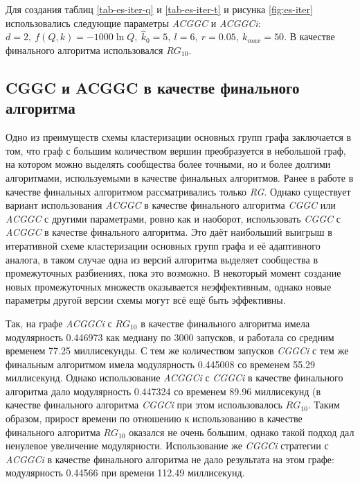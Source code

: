 Для создания таблиц \ref{tab-es-iter-q} и \ref{tab-es-iter-t} и рисунка \ref{fig:es-iter} использовались следующие параметры \emph{ACGGC} и \emph{ACGGCi}: $d = 2,\ f(Q, k) = -1000 \ln Q,\ \hat{k}_0 = 5,\ l = 6,\ r = 0.05,\ k_{max} = 50$. В качестве финального алгоритма использовался $RG_{10}$.



\subsection{CGGC и ACGGC в качестве финального алгоритма}

Одно из преимуществ схемы кластеризации основных групп графа заключается в том, что граф с большим количеством вершин преобразуется в небольшой граф, на котором можно выделять сообщества более точными, но и более долгими алгоритмами, используемыми в качестве финальных алгоритмов. Ранее в работе в качестве финальных алгоритмом рассматривались только \emph{RG}. Однако существует вариант использования \emph{ACGGC} в качестве финального алгоритма \emph{CGGC} или \emph{ACGGC} с другими параметрами, ровно как и наоборот, использовать \emph{CGGC} с \emph{ACGGC} в качестве финального алгоритма. Это даёт наибольший выигрыш в итеративной схеме кластеризации основных групп графа и её адаптивного аналога, в таком случае одна из версий алгоритма выделяет сообщества в промежуточных разбиениях, пока это возможно. В некоторый момент создание новых промежуточных множеств оказывается неэффективным, однако новые параметры другой версии схемы могут всё ещё быть эффективны.

Так, на графе \emph{\celegans} \emph{ACGGCi} с $RG_{10}$ в качестве финального алгоритма имела модулярность 0.446973 как медиану по 3000 запусков, и работала со средним временем 77.25 миллисекунды. С тем же количеством запусков \emph{CGGCi} с тем же финальным алгоритмом имела модулярность 0.445008 со временем 55.29 миллисекунд. Однако использование \emph{ACGGCi} с \emph{CGGCi} в качестве финального алгоритма дало модулярность 0.447324 со временем 89.96 миллисекунд (в качестве финального алгоритма \emph{CGGCi} при этом использовалось $RG_{10}$. Таким образом, прирост времени по отношению к использованию в качестве финального алгоритма $RG_{10}$ оказался не очень большим, однако такой подход дал ненулевое увеличение модулярности. Использование же \emph{CGGCi} стратегии с \emph{ACGGCi} в качестве финального алгоритма не дало результата на этом графе: модулярность 0.44566 при времени 112.49 миллисекунд.

